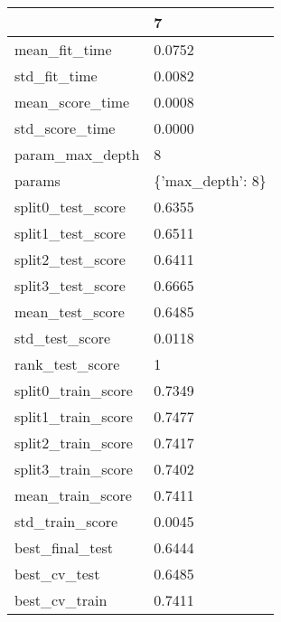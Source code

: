 \begin{tabular}{ll}
\toprule
{} &                 7 \\
\midrule
mean\_fit\_time      &            0.0752 \\
std\_fit\_time       &            0.0082 \\
mean\_score\_time    &            0.0008 \\
std\_score\_time     &            0.0000 \\
param\_max\_depth    &                 8 \\
params             &  \{'max\_depth': 8\} \\
split0\_test\_score  &            0.6355 \\
split1\_test\_score  &            0.6511 \\
split2\_test\_score  &            0.6411 \\
split3\_test\_score  &            0.6665 \\
mean\_test\_score    &            0.6485 \\
std\_test\_score     &            0.0118 \\
rank\_test\_score    &                 1 \\
split0\_train\_score &            0.7349 \\
split1\_train\_score &            0.7477 \\
split2\_train\_score &            0.7417 \\
split3\_train\_score &            0.7402 \\
mean\_train\_score   &            0.7411 \\
std\_train\_score    &            0.0045 \\
best\_final\_test    &            0.6444 \\
best\_cv\_test       &            0.6485 \\
best\_cv\_train      &            0.7411 \\
\bottomrule
\end{tabular}

